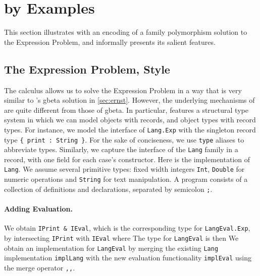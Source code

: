 
\section{\namee by Examples}
\label{nested:sec:overview}

This section illustrates \namee with an encoding of a family polymorphism
solution to the Expression Problem, and informally presents its salient
features.


\subsection{The Expression Problem, \namee Style}

The \namee calculus allows us to solve the Expression Problem in a way that is
very similar to \citeauthor{Ernst_2001}'s \textsf{gbeta} solution in \cref{sec:ernst}.
However, the underlying mechanisms of \namee are quite different from those of
\textsf{gbeta}. In particular, \namee features a structural type system in which we can
model objects with records, and object types with record types. For instance, we
model the interface of \lstinline{Lang.Exp} with the singleton record type
\lstinline${ print : String }$. For the sake of conciseness, we use \lstinline{type} aliases
to abbreviate types.
Similarly, we capture the interface of the \lstinline{Lang} family in a record,
with one field for each case's constructor.
Here is the implementation of \lstinline{Lang}.
We assume several primitive types: fixed width integers \lstinline{Int},
\lstinline{Double} for numeric operations and \lstinline{String} for text
manipulation. A \namee program consists of a collection of definitions and
declarations, separated by semicolon \lstinline{;}.

\paragraph{Adding Evaluation.}
We obtain \lstinline{IPrint & IEval}, which is the corresponding type for \lstinline{LangEval.Exp}, by
intersecting \lstinline{IPrint} with \lstinline{IEval} where
The type for \lstinline{LangEval} is then
We obtain an implementation for \lstinline{LangEval} by merging the existing
\lstinline{Lang} implementation \lstinline{implLang} with the new evaluation
functionality \lstinline{implEval} using the merge operator \lstinline{,,}.

